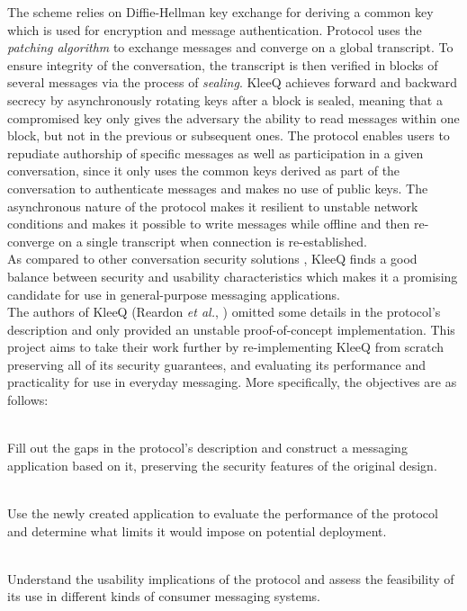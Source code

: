 \documentclass[a4paper, 12pt]{report}
\begin{document}
The scheme relies on Diffie-Hellman key exchange for deriving a common key which is used for encryption and message authentication. Protocol uses the \emph{patching algorithm} to exchange messages and converge on a global transcript. To ensure integrity of the conversation, the transcript is then verified in blocks of several messages via the process of \emph{sealing}. KleeQ achieves forward and backward secrecy by asynchronously rotating keys after a block is sealed, meaning that a compromised key only gives the adversary the ability to read messages within one block, but not in the previous or subsequent ones. The protocol enables users to repudiate authorship of specific messages as well as participation in a given conversation, since it only uses the common keys derived as part of the conversation to authenticate messages and makes no use of public keys. The asynchronous nature of the protocol makes it resilient to unstable network conditions and makes it possible to write messages while offline and then re-converge on a single transcript when connection is re-established. \\

As compared to other conversation security solutions \cite{unger2015sok}, KleeQ finds a good balance between security and usability characteristics which makes it a promising candidate for use in general-purpose messaging applications. \\

The authors of KleeQ (Reardon \textit{et al.}, \cite{reardon2007kleeq}) omitted some details in the protocol's description and only provided an unstable proof-of-concept implementation. This project aims to take their work further by re-implementing KleeQ from scratch preserving all of its security guarantees, and evaluating its performance and practicality for use in everyday messaging. More specifically, the objectives are as follows:

\begin{description}[labelindent=0.5cm, leftmargin=1.3cm, rightmargin=0.5cm]
    \item[Implementation] \hfill \\
        Fill out the gaps in the protocol's description and construct a messaging application based on it, preserving the security features of the original design.
        
    \item[Evaluation of Performance] \hfill \\
        Use the newly created application to evaluate the performance of the protocol and determine what limits it would impose on potential deployment.
        
    \item[Evaluation of Usability] \hfill \\
        Understand the usability implications of the protocol and assess the feasibility of its use in different kinds of consumer messaging systems.

\end{description}
\end{document}
